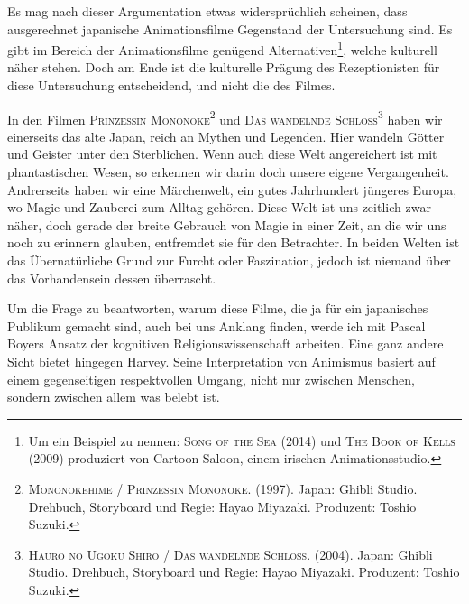 Es mag nach dieser Argumentation etwas widersprüchlich scheinen, dass ausgerechnet japanische Animationsfilme Gegenstand der Untersuchung sind. Es gibt im Bereich der Animationsfilme genügend Alternativen\footnote{Um ein Beispiel zu nennen: \textsc{Song of the Sea} (2014) und \textsc{The Book of Kells} (2009) produziert von Cartoon Saloon, einem irischen Animationsstudio.}, welche kulturell näher stehen. Doch am Ende ist die kulturelle Prägung des Rezeptionisten für diese Untersuchung entscheidend, und nicht die des Filmes. 

In den Filmen \textsc{Prinzessin Mononoke}\footnote{\textsc{Mononokehime / Prinzessin Mononoke}. (1997). Japan: Ghibli Studio. Drehbuch, Story\-board und Regie: Hayao Miyazaki. Produzent: Toshio Suzuki.} und \textsc{Das wandelnde Schloss}\footnote{\textsc{Hauro no Ugoku Shiro / Das wandelnde Schloss}. (2004). Japan: Ghibli Studio. Drehbuch, Storyboard und Regie: Hayao Miyazaki. Produzent: Toshio Suzuki.} haben wir einerseits das alte Japan, reich an Mythen und Legenden. Hier wandeln Götter und Geister unter den Sterblichen. Wenn auch diese Welt ange\-reichert ist mit phantastischen Wesen, so erkennen wir darin doch unsere eigene Vergangenheit. Andrerseits haben wir eine Märchenwelt, ein gutes Jahrhundert jüngeres Europa, wo Magie und Zauberei zum Alltag gehören. Diese Welt ist uns zeitlich zwar näher, doch gerade der breite Gebrauch von Magie in einer Zeit, an die wir uns noch zu erinnern glauben, entfremdet sie für den Betrachter. In beiden Welten ist das Übernatürliche Grund zur Furcht oder Faszination, jedoch ist niemand über das Vorhandensein dessen überrascht.

Um die Frage zu beantworten, warum diese Filme, die ja für ein japanisches Publikum gemacht sind, auch bei uns Anklang finden, werde ich mit Pascal Boyers Ansatz der kognitiven Religionswissenschaft arbeiten. Eine ganz andere Sicht bietet hingegen Harvey. Seine Interpretation von Animismus basiert auf einem gegenseitigen respektvollen Umgang, nicht nur zwischen Menschen, sondern zwischen allem was belebt ist.

